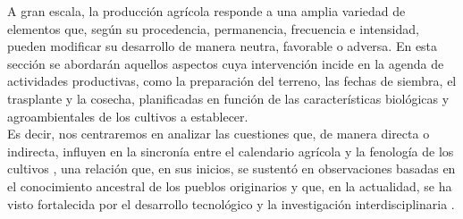A gran escala, la producción agrícola responde a una amplia variedad de elementos que, según su procedencia, permanencia, frecuencia e intensidad, pueden modificar su desarrollo de manera neutra, favorable o adversa. En esta sección se abordarán aquellos aspectos cuya intervención incide en la agenda de actividades productivas, como la preparación del terreno, las fechas de siembra, el trasplante y la cosecha, planificadas en función de las características biológicas y agroambientales de los cultivos a establecer.\\

Es decir, nos centraremos en analizar las cuestiones que, de manera directa o indirecta, influyen en la sincronía entre el calendario agrícola y la fenología de los cultivos \cite{DGSIAP, Dimou_2018, Franch_2022}, una relación que, en sus inicios, se sustentó en observaciones basadas en el conocimiento ancestral de los pueblos originarios \cite{Omran_2020, Vazquez-Cercas_2023} y que, en la actualidad, se ha visto fortalecida por el desarrollo tecnológico y la investigación interdisciplinaria \cite{Islam_2025, Jeba_2024, Kumudini_2014, Minoli_2022}.